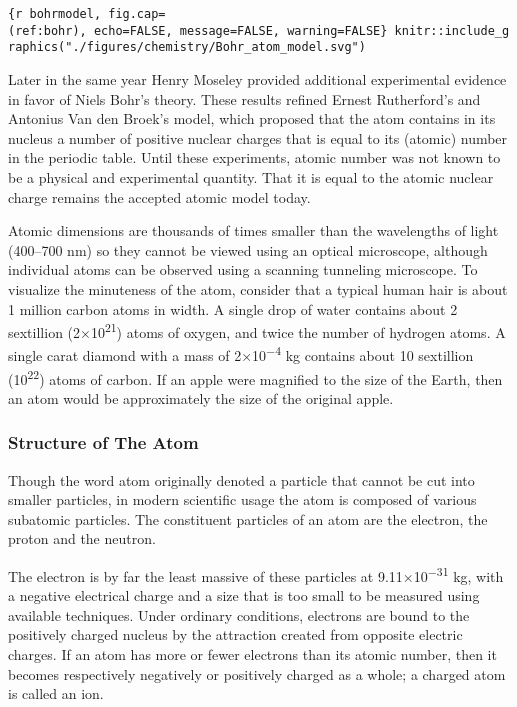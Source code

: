 \documentclass[
]{article}
\begin{document}
\texttt{\{r\ bohrmodel,\ fig.cap=\textquotesingle{}(ref:bohr)\textquotesingle{},\ echo=FALSE,\ message=FALSE,\ warning=FALSE\}\ knitr::include\_graphics("./figures/chemistry/Bohr\_atom\_model.svg")}

Later in the same year Henry Moseley provided additional experimental
evidence in favor of Niels Bohr's theory. These results refined Ernest
Rutherford's and Antonius Van den Broek's model, which proposed that the
atom contains in its nucleus a number of positive nuclear charges that
is equal to its (atomic) number in the periodic table. Until these
experiments, atomic number was not known to be a physical and
experimental quantity. That it is equal to the atomic nuclear charge
remains the accepted atomic model today.

Atomic dimensions are thousands of times smaller than the wavelengths of
light (400--700 nm) so they cannot be viewed using an optical
microscope, although individual atoms can be observed using a scanning
tunneling microscope. To visualize the minuteness of the atom, consider
that a typical human hair is about 1 million carbon atoms in width. A
single drop of water contains about 2 sextillion
(2×10\textsuperscript{21}) atoms of oxygen, and twice the number of
hydrogen atoms. A single carat diamond with a mass of
2×10\textsuperscript{−4} kg contains about 10 sextillion
(10\textsuperscript{22}) atoms of carbon. If an apple were magnified to
the size of the Earth, then an atom would be approximately the size of
the original apple.

\hypertarget{structure-of-the-atom}{%
\subsubsection{Structure of The Atom}\label{structure-of-the-atom}}

Though the word atom originally denoted a particle that cannot be cut
into smaller particles, in modern scientific usage the atom is composed
of various subatomic particles. The constituent particles of an atom are
the electron, the proton and the neutron.

The electron is by far the least massive of these particles at
9.11×10\textsuperscript{−31} kg, with a negative electrical charge and a
size that is too small to be measured using available techniques. Under
ordinary conditions, electrons are bound to the positively charged
nucleus by the attraction created from opposite electric charges. If an
atom has more or fewer electrons than its atomic number, then it becomes
respectively negatively or positively charged as a whole; a charged atom
is called an ion.
\end{document}
